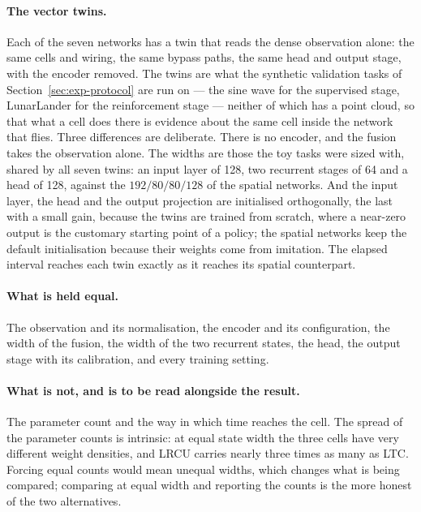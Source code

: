 \paragraph{The vector twins.}
Each of the seven networks has a twin that reads the dense observation alone:
the same cells and wiring, the same bypass paths, the same head and output
stage, with the encoder removed. The twins are what the synthetic validation
tasks of Section~\ref{sec:exp-protocol} are run on --- the sine wave for the
supervised stage, LunarLander for the reinforcement stage --- neither of which
has a point cloud, so that what a cell does there is evidence about the same
cell inside the network that flies. Three differences are deliberate. There is
no encoder, and the fusion takes the observation alone. The widths are those the
toy tasks were sized with, shared by all seven twins: an input layer of
\num{128}, two recurrent stages of \num{64} and a head of \num{128}, against
the $192/80/80/128$ of the spatial networks. And the input layer, the head and
the output projection are initialised orthogonally, the last with a small gain,
because the twins are trained from scratch, where a near-zero output is the
customary starting point of a policy; the spatial networks keep the default
initialisation because their weights come from imitation. The elapsed interval
reaches each twin exactly as it reaches its spatial counterpart.

\paragraph{What is held equal.}
The observation and its normalisation, the encoder and its configuration, the
width of the fusion, the width of the two recurrent states, the head, the output
stage with its calibration, and every training setting.

\paragraph{What is not, and is to be read alongside the result.}
The parameter count and the way in which time reaches the cell. The spread of
the parameter counts is intrinsic: at equal state width the three cells have
very different weight densities, and LRCU carries nearly three times as many as
LTC. Forcing equal counts would mean unequal widths, which changes what is being
compared; comparing at equal width and reporting the counts is the more honest
of the two alternatives.

